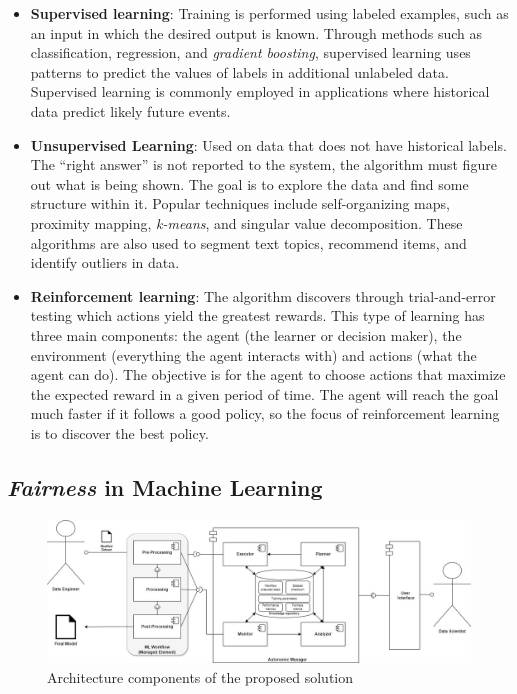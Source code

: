 \documentclass[10pt,conference]{IEEEtran}
\begin{document}
\begin{itemize}
\item \textbf{Supervised learning}: Training is performed using labeled examples, such as an input in which the desired output is known. Through methods such as classification, regression, and \textit{gradient boosting}, supervised learning uses patterns to predict the values of labels in additional unlabeled data. Supervised learning is commonly employed in applications where historical data predict likely future events.
\item \textbf{Unsupervised Learning}: Used on data that does not have historical labels. The “right answer” is not reported to the system, the algorithm must figure out what is being shown. The goal is to explore the data and find some structure within it. Popular techniques include self-organizing maps, proximity mapping, \textit{k-means}, and singular value decomposition. These algorithms are also used to segment text topics, recommend items, and identify outliers in data.
\item \textbf{Reinforcement learning}: The algorithm discovers through trial-and-error testing which actions yield the greatest rewards. This type of learning has three main components: the agent (the learner or decision maker), the environment (everything the agent interacts with) and actions (what the agent can do). The objective is for the agent to choose actions that maximize the expected reward in a given period of time. The agent will reach the goal much faster if it follows a good policy, so the focus of reinforcement learning is to discover the best policy.
\end{itemize}

\subsection{\textit{Fairness} in Machine Learning}

\begin{figure}[h]
\centering
\includegraphics[scale=0.4]{images/backend-frontend-ml-eng.jpg}
\caption {Architecture components of the proposed solution}
\label{fig:BackendFrontendML}
\end{figure}
\end{document}
